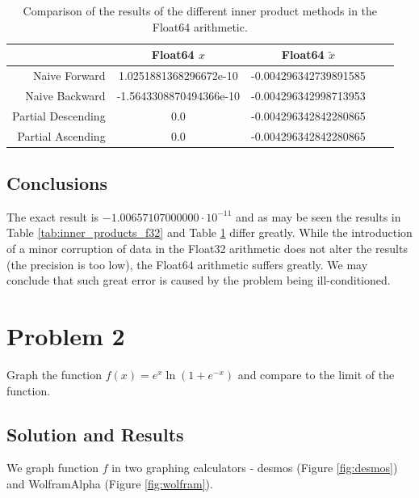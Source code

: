\documentclass[a4paper, 12pt]{article}
\begin{document}
\begin{table}[H]
\centering
\begin{tabular}{@{}rcccc@{}}
\toprule
                   & Float64 $x$             & Float64 $\tilde{x}$   \\ \midrule
Naive Forward      & 1.0251881368296672e-10  & -0.004296342739891585 \\ \midrule
Naive Backward     & -1.5643308870494366e-10 & -0.004296342998713953 \\ \midrule
Partial Descending & 0.0                     & -0.004296342842280865 \\ \midrule
Partial Ascending  & 0.0                     & -0.004296342842280865 \\ \bottomrule
\end{tabular}
\caption{Comparison of the results of the different inner product methods in the
Float64 arithmetic.}
\label{tab:inner_products_f64}
\end{table}

\subsection{Conclusions}
The exact result is $-1.00657107000000 \cdot 10^{-11}$ and as may be seen the
results in Table \ref{tab:inner_products_f32} and Table
\ref{tab:inner_products_f64} differ greatly. While the introduction of a minor
corruption of data in the Float32 arithmetic does not alter the results (the
precision is too low), the Float64 arithmetic suffers greatly. We may conclude
that such great error is caused by the problem being ill-conditioned.

\section{Problem 2}
Graph the function $f(x) = e^x \ln\left(1+e^{-x}\right)$ and compare to the
limit of the function.

\subsection{Solution and Results}
We graph function $f$ in two graphing calculators - desmos (Figure \ref{fig:desmos}) and WolframAlpha (Figure \ref{fig:wolfram}).
\end{document}
